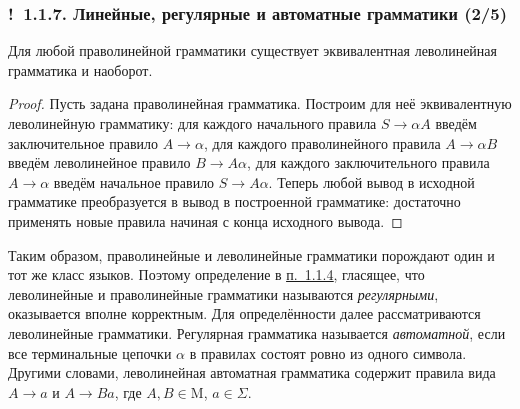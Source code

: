 \documentclass[mathserif,12pt,aspectratio=169]{beamer}
\renewcommand{\index}[1]{}
\def\odmkey#1#2{{\it\color{red} #1}\index{#2}}
\def\DMref#1#2{{\color{blue}\underline{\hyperlink{#2}{#1}}}}
\def\Ok{{\color{green}\textbf{!}\ }}
\begin{document}
\begin{frame}
\frametitle{\Ok 1.1.7. Линейные, регулярные и автоматные грамматики (2/5)}
\begin{theorem}
Для любой праволинейной грамматики 
существует эквивалентная леволинейная грамматика
и наоборот.
\end{theorem}
\begin{proof}
Пусть задана праволинейная грамматика. 
Построим для неё эквивалентную 
леволинейную грамматику: 
для каждого начального правила 
$S\rightarrow \alpha A$ введём
заключительное правило 
$A\rightarrow \alpha$,
для каждого праволинейного правила 
$A\rightarrow \alpha B$ введём
леволинейное правило 
$B\rightarrow A\alpha$,
для каждого заключительного правила 
$A\rightarrow \alpha$ введём
начальное правило 
$S\rightarrow A\alpha $.
Теперь любой вывод 
в исходной грамматике 
преобразуется в вывод в построенной грамматике:
достаточно применять новые правила начиная с конца исходного вывода.
\end{proof}

Таким образом, праволинейные и леволинейные грамматики порождают один и тот же класс языков.
Поэтому определение в \DMref{п.~1.1.4}{1.1.4.}, 
гласящее, что леволинейные и
праволинейные грамматики называются
\odmkey{регулярными}{Грамматика!регулярная},
оказывается вполне корректным. 
Для определённости далее рассматриваются леволинейные грамматики. 
Регулярная грамматика
называется \odmkey{автоматной}{Грамматика!автоматная}, если все
терминальные цепочки $\alpha$ в правилах состоят ровно из одного
символа. Другими словами, леволинейная автоматная грамматика
содержит правила вида $A\rightarrow a$ и $A\rightarrow B a$, где
$A, B \in \mathrm{M}$, $a\in \Sigma$.

\end{frame}
\end{document}
